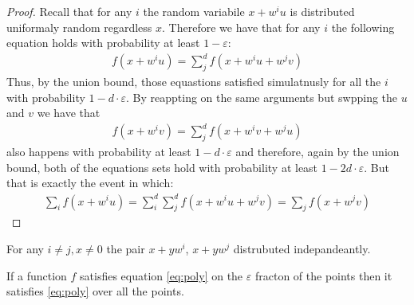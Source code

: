 \begin{proof}
  Recall that for any $i$ the random variabile $x + w^{i}u$ is distributed uniformaly random regardless $x$. Therefore we have that for any $i$ the following equation holds with probability at least $1 -\varepsilon$:      
  \begin{equation*}
    \begin{split}
    f\left( x + w^{i}u \right) = \sum_{j}^{d}{f\left( x +w^{i}u + w^{j}v \right)} 
    \end{split}
  \end{equation*}
  Thus, by the union bound, those equastions satisfied simulatnusly for all the $i$ with probability $1 - d\cdot \varepsilon$. By reappting on the same arguments but swpping the $u$ and $v$ we have that 
\begin{equation*}
    \begin{split}
    f\left( x + w^{i}v \right) = \sum_{j}^{d}{f\left( x +w^{i}v + w^{j}u \right)} 
    \end{split}
  \end{equation*}
also happens with probability at least $1- d\cdot\varepsilon$ and therefore, again by the union bound, both of the equations sets hold with probability at least $1 - 2d\cdot\varepsilon$. But that is exactly the event in which: 
\begin{equation*}
  \begin{split} 
    \sum_{i}{f\left( x + w^{i}u \right)} = \sum_{i}^{d}\sum^{d}_{j}{f\left( x +w^{i}u + w^{j}v \right)} =  \sum_{j}{f\left( x + w^{j}v \right)}
  \end{split}
\end{equation*}
\end{proof}
\begin{claim}
For any $i\neq j,x \neq 0 $ the pair $x + yw^{i}$, $x+ yw^{j}$ distrubuted indepandeantly.
\end{claim}

\begin{claim}
  If a function $f$ satisfies equation \cref{eq:poly} on the $\varepsilon$ fracton of the points then it satisfies \cref{eq:poly} over all the points.
\end{claim}

